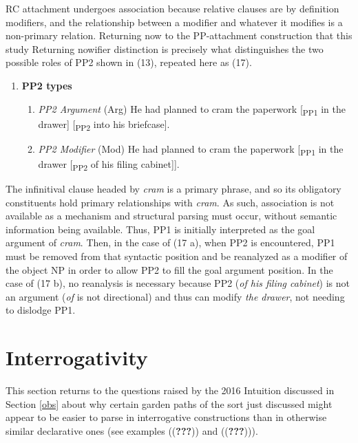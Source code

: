 \documentclass[12pt,oneside]{book}
\providecommand{\tightlist}{%
  \setlength{\itemsep}{0pt}\setlength{\parskip}{0pt}}
\begin{document}
RC attachment undergoes association because relative clauses are by definition modifiers, and the relationship between a modifier and whatever it modifies is a non-primary relation. Returning now to the PP-attachment construction that this study Returning nowifier distinction is precisely what distinguishes the two possible roles of PP2 shown in (13), repeated here as (17).

\begin{enumerate}
\def\labelenumi{(\arabic{enumi})}
\setcounter{enumi}{16}
\tightlist
\item
  \textbf{PP2 types}

  \begin{enumerate}
  \def\labelenumii{(\alph{enumii})}
  \tightlist
  \item
    \emph{PP2 Argument} (Arg)
    He had planned to cram the paperwork {[}\textsubscript{PP1} in the drawer{]} {[}\textsubscript{PP2} into his briefcase{]}.
  \item
    \emph{PP2 Modifier} (Mod)
    He had planned to cram the paperwork {[}\textsubscript{PP1} in the drawer {[}\textsubscript{PP2} of his filing cabinet{]}{]}.
  \end{enumerate}
\end{enumerate}

The infinitival clause headed by \emph{cram} is a primary phrase, and so its obligatory constituents hold primary relationships with \emph{cram}. As such, association is not available as a mechanism and structural parsing must occur, without semantic information being available. Thus, PP1 is initially interpreted as the goal argument of \emph{cram}. Then, in the case of (17 a), when PP2 is encountered, PP1 must be removed from that syntactic position and be reanalyzed as a modifier of the object NP in order to allow PP2 to fill the goal argument position. In the case of (17 b), no reanalysis is necessary because PP2 (\emph{of his filing cabinet}) is not an argument (\emph{of} is not directional) and thus can modify \emph{the drawer}, not needing to dislodge PP1.

\hypertarget{intg}{%
\section{Interrogativity}\label{intg}}

This section returns to the questions raised by the 2016 Intuition discussed in Section \ref{obs} about why certain garden paths of the sort just discussed might appear to be easier to parse in interrogative constructions than in otherwise similar declarative ones (see examples (({\textbf{???}})) and (({\textbf{???}}))).
\end{document}
